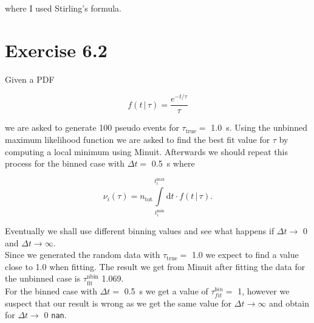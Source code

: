 \documentclass[10pt]{article}
\newenvironment{myfont}{\fontfamily{put}\selectfont}{\par}
\begin{document}
\begin{myfont}
\noindent where I used Stirling's formula.


\section*{Exercise 6.2}

\noindent Given a PDF 

\begin{equation}
f(t\, | \, \tau) = \frac{e^{-t/\tau}}{\tau}
\end{equation}

\noindent we are asked to generate \num{100} pseudo events for $\tau_{\textrm{true}} =$ \SI{1.0}{\second}.
Using the unbinned maximum likelihood function we are asked to find the best fit value for $\tau$ by computing a local minimum using Minuit.
Afterwards we should repeat this process for the binned case with $\Delta t =$ \SI{0.5}{\second} where

\begin{equation}
\nu_{i}(\tau) = n_{\textrm{tot}} \int\limits_{t_{i}^{\textrm{min}}}^{t_{i}^{\textrm{max}}} \textrm{d}t \cdot f(t\, | \, \tau).
\end{equation}

\noindent Eventually we shall use different binning values and see what happens if $\Delta t \rightarrow $ \num{0} and $\Delta t \rightarrow \infty$. \\

\noindent Since we generated the random data with $\tau_{\textrm{true}} =$ \num{1.0} we expect to find a value close to \num{1.0} when fitting.
The result we get from Minuit after fitting the data for the unbinned case is $\tau_{\textrm{fit}}^{\textrm{ubin}}$ \num{1.069}. \\

\noindent For the binned case with $\Delta t =$ \SI{0.5}{\second} we get a value of $\tau_{fit}^{bin} =$ \num{1}, however we suspect that our result is wrong as we get the same value for $\Delta t \rightarrow \infty$ and obtain for $\Delta t \rightarrow$ \num{0} \texttt{nan}.

\end{myfont}
\end{document}
